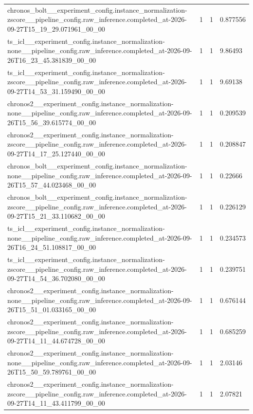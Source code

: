 \begin{tabular}{llll}
chronos\_bolt\_\_experiment\_config.instance\_normalization-zscore\_\_pipeline\_config.raw\_inference.completed\_at-2026-09-27T15\_19\_29.071961\_00\_00 & 1 & 1 & 0.877556 \\
ts\_icl\_\_experiment\_config.instance\_normalization-none\_\_pipeline\_config.raw\_inference.completed\_at-2026-09-26T16\_23\_45.381839\_00\_00 & 1 & 1 & 9.86493 \\
ts\_icl\_\_experiment\_config.instance\_normalization-zscore\_\_pipeline\_config.raw\_inference.completed\_at-2026-09-27T14\_53\_31.159490\_00\_00 & 1 & 1 & 9.69138 \\
chronos2\_\_experiment\_config.instance\_normalization-none\_\_pipeline\_config.raw\_inference.completed\_at-2026-09-26T15\_56\_39.615774\_00\_00 & 1 & 1 & 0.209539 \\
chronos2\_\_experiment\_config.instance\_normalization-zscore\_\_pipeline\_config.raw\_inference.completed\_at-2026-09-27T14\_17\_25.127440\_00\_00 & 1 & 1 & 0.208847 \\
chronos\_bolt\_\_experiment\_config.instance\_normalization-none\_\_pipeline\_config.raw\_inference.completed\_at-2026-09-26T15\_57\_44.023468\_00\_00 & 1 & 1 & 0.22666 \\
chronos\_bolt\_\_experiment\_config.instance\_normalization-zscore\_\_pipeline\_config.raw\_inference.completed\_at-2026-09-27T15\_21\_33.110682\_00\_00 & 1 & 1 & 0.226129 \\
ts\_icl\_\_experiment\_config.instance\_normalization-none\_\_pipeline\_config.raw\_inference.completed\_at-2026-09-26T16\_24\_51.108817\_00\_00 & 1 & 1 & 0.234573 \\
ts\_icl\_\_experiment\_config.instance\_normalization-zscore\_\_pipeline\_config.raw\_inference.completed\_at-2026-09-27T14\_54\_36.702080\_00\_00 & 1 & 1 & 0.239751 \\
chronos2\_\_experiment\_config.instance\_normalization-none\_\_pipeline\_config.raw\_inference.completed\_at-2026-09-26T15\_51\_01.033165\_00\_00 & 1 & 1 & 0.676144 \\
chronos2\_\_experiment\_config.instance\_normalization-zscore\_\_pipeline\_config.raw\_inference.completed\_at-2026-09-27T14\_11\_44.674728\_00\_00 & 1 & 1 & 0.685259 \\
chronos2\_\_experiment\_config.instance\_normalization-none\_\_pipeline\_config.raw\_inference.completed\_at-2026-09-26T15\_50\_59.789761\_00\_00 & 1 & 1 & 2.03146 \\
chronos2\_\_experiment\_config.instance\_normalization-zscore\_\_pipeline\_config.raw\_inference.completed\_at-2026-09-27T14\_11\_43.411799\_00\_00 & 1 & 1 & 2.07821 \\

\end{tabular}
